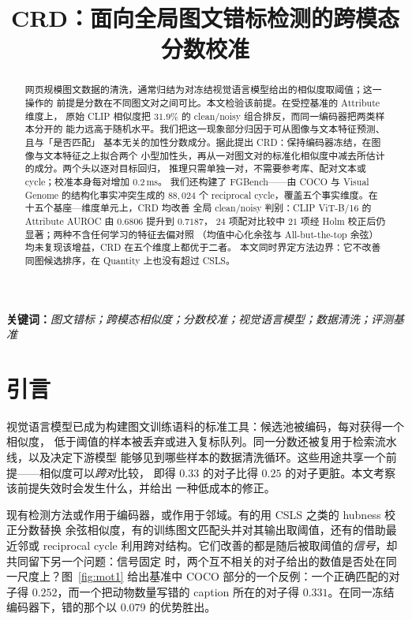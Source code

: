 \documentclass[10pt,twocolumn,a4paper]{ctexart}
\title{\bfseries CRD：面向全局图文错标检测的跨模态分数校准}
\author{}
\date{}
\begin{document}
\maketitle

\begin{abstract}
\noindent
网页规模图文数据的清洗，通常归结为对冻结视觉语言模型给出的相似度取阈值；这一操作的
前提是分数在不同图文对之间可比。本文检验该前提。在受控基准的 Attribute 维度上，
原始 CLIP 相似度把 $31.9\%$ 的 clean/noisy 组合排反，而同一编码器把两类样本分开的
能力远高于随机水平。我们把这一现象部分归因于可从图像与文本特征预测、且与「是否匹配」
基本无关的加性分数成分。据此提出 CRD：保持编码器冻结，在图像与文本特征之上拟合两个
小型加性头，再从一对图文对的标准化相似度中减去所估计的成分。两个头以逐对目标回归，
推理只需单独一对，不需要参考库、配对文本或 cycle；校准本身每对增加 $0.2$\,ms。
我们还构建了 FGBench——由 COCO 与 Visual Genome 的结构化事实冲突生成的
$88{,}024$ 个 reciprocal cycle，覆盖五个事实维度。在十五个基座—维度单元上，CRD 均改善
全局 clean/noisy 判别：CLIP ViT-B/16 的 Attribute AUROC 由 $0.6806$ 提升到 $0.7187$，
$24$ 项配对比较中 $21$ 项经 Holm 校正后仍显著；两种不含任何学习的特征去偏对照
（均值中心化余弦与 All-but-the-top 余弦）均未复现该增益，CRD 在五个维度上都优于二者。
本文同时界定方法边界：它不改善同图候选排序，在 Quantity 上也没有超过 CSLS。
\end{abstract}

\noindent\textbf{关键词：}\emph{图文错标；跨模态相似度；分数校准；视觉语言模型；数据清洗；评测基准}

\section{引言}

视觉语言模型已成为构建图文训练语料的标准工具：候选池被编码，每对获得一个相似度，
低于阈值的样本被丢弃或进入复标队列。同一分数还被复用于检索流水线，以及决定下游模型
能够见到哪些样本的数据清洗循环。这些用途共享一个前提——相似度可以\emph{跨对}比较，
即得 $0.33$ 的对子比得 $0.25$ 的对子更脏。本文考察该前提失效时会发生什么，并给出
一种低成本的修正。

现有检测方法或作用于编码器，或作用于邻域。有的用 CSLS 之类的 hubness 校正分数替换
余弦相似度，有的训练图文匹配头并对其输出取阈值，还有的借助最近邻或 reciprocal cycle
利用跨对结构。它们改善的都是随后被取阈值的\emph{信号}，却共同留下另一个问题：信号固定
时，两个互不相关的对子给出的数值是否处在同一尺度上？图~\ref{fig:mot1} 给出基准中
COCO 部分的一个反例：一个正确匹配的对子得 $0.252$，而一个把动物数量写错的 caption
所在的对子得 $0.331$。在同一冻结编码器下，错的那个以 $0.079$ 的优势胜出。
\end{document}
